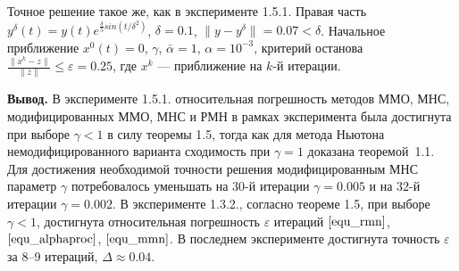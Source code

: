 Точное решение такое же, как в эксперименте 1.5.1. Правая часть $y^\delta(t)=y(t)e^{\frac{\delta}{5} sin(t/{\delta}^2)}$, $\delta=0.1$, $\|y-y^{\delta}\|=0.07<\delta$. Начальное приближение $x^0(t)=0$, $\gamma$, $\bar\alpha=1$, $\alpha=10^{-3}$, критерий останова $\frac{\|x^k-z\|}{\|z\|}\le\varepsilon=0.25$, где $x^k$ --- приближение на $k$-й итерации.

{\bfseries\large Вывод.} В эксперименте 1.5.1. относительная погрешность методов ММО, МНС, модифицированных ММО, МНС и РМН в рамках эксперимента была достигнута при выборе $\gamma<1$ в силу теоремы 1.5, тогда как для метода Ньютона немодифицированного варианта сходимость при $\gamma=1$ доказана теоремой~1.1. Для достижения необходимой точности решения модифицированным МНС параметр $\gamma$ потребовалось уменьшать на 30-й итерации $\gamma=0.005$ и на 32-й итерации $\gamma=0.002$.
В эксперименте 1.3.2., согласно теореме 1.5, при выборе $\gamma<1$, достигнута относительная погрешность $\varepsilon$ итераций $\eqref{equ_rmn}$, $\eqref{equ_alphaproc}$, $\eqref{equ_mmn}$. 
В последнем эксперименте  достигнута точность $\varepsilon$ за 8--9 итераций, $\Delta\approx 0.04$.

%

